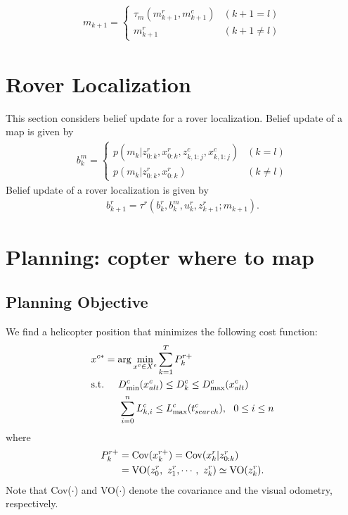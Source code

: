 \documentclass[conference]{IEEEtran}
\begin{document}
\begin{eqnarray}
m_{k+1} =
  \begin{cases}
    \tau_m (m^r_{k+1}, m^c_{k+1}) & (k+1 = l)\\
    m^r_{k+1} & (k+1 \neq l)
  \end{cases}
\end{eqnarray}

\section{Rover Localization}
This section considers belief update for a rover localization. Belief update of a map is given by
\begin{eqnarray}
    b^{m}_k=
    \begin{cases}
    p(m_k | z^r_{0:k}, x^r_{0:k}, z^c_{k,1:j}, x^c_{k,1:j}) & (k=l)\\
    p(m_k | z^r_{0:k}, x^r_{0:k}) & (k \neq l)
    \end{cases}
\end{eqnarray}
Belief update of a rover localization is given by
\begin{align}
    b^r_{k+1}=\tau^r (b^r_k, b^m_k, u^r_k, z^r_{k+1}; m_{k+1}).
\end{align}

\section{Planning: copter where to map}
\subsection{Planning Objective}

We find a helicopter position that minimizes the following cost function:
\begin{align}
    &x^{c*}=\arg\min_{x^c \in X^c} \sum^T_{k=1} P^{r+}_k\label{eq:c1}\\
     &{\rm s.t.} \hspace{5mm} D^c_{\min}(x^c_{alt}) \leq D^c_k \leq D^c_{\max}(x^c_{alt})\label{eq:st1}\\
    &\hspace{10mm} \sum^{n}_{i=0} L^c_{k,i} \leq L^c_{\max}(t^c_{search}), ~~0\leq i \leq n \label{eq:st2}
\end{align}
where
\begin{align}
P^{r+}_k&={\rm Cov}(x^{r+}_k) = {\rm Cov}(x^{r}_k | z^r_{0:k})\label{eq:p1}\\
&={\rm VO}(z^r_0,~z^r_1,\cdots,~z^r_k)\simeq {\rm VO}(z^r_k).\label{eq:p2}
\end{align}
Note that Cov($\cdot$) and VO($\cdot$) denote the covariance and the visual odometry, respectively.
\end{document}
